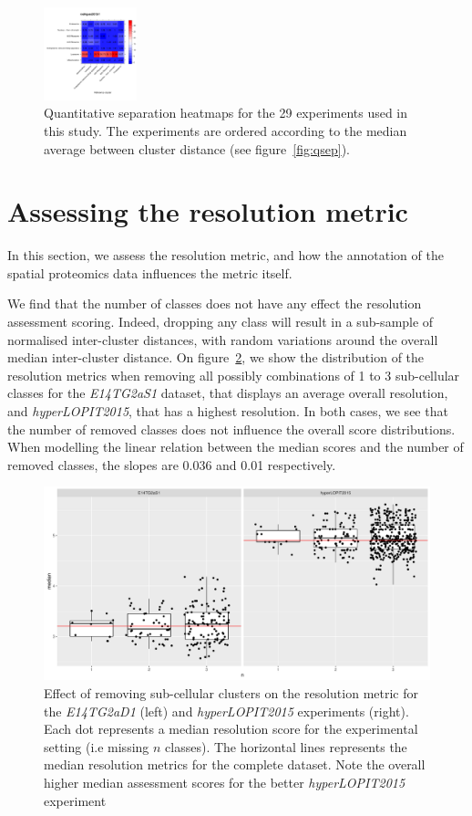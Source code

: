 \documentclass[12pt]{article}\usepackage[]{graphicx}\usepackage[]{color}
\begin{document}
\begin{figure}[p]
  \includegraphics[width = 0.24\textwidth]{./figure/allhmaps-20.pdf}
  \caption{Quantitative separation heatmaps for the 29
    experiments used in this study. The experiments are ordered
    according to the median average between cluster distance (see
    figure~\ref{fig:qsep}). }
  \label{fig:allhmaps}
\end{figure}

\clearpage

\section{Assessing the resolution metric}\label{sec:qsepassess}

In this section, we assess the resolution metric, and how the
annotation of the spatial proteomics data influences the metric
itself.



We find that the number of classes does not have any effect the resolution
assessment scoring. Indeed, dropping any class will result in a
sub-sample of normalised inter-cluster distances, with random
variations around the overall median inter-cluster distance. On
figure~\ref{fig:simn}, we show the distribution of the resolution
metrics when removing all possibly combinations of 1 to 3 sub-cellular
classes for the \textit{E14TG2aS1} dataset, that displays an average
overall resolution, and \textit{hyperLOPIT2015}, that has a highest
resolution. In both cases, we see that the number of removed classes
does not influence the overall score distributions. When modelling the
linear relation between the median scores and the number of removed
classes, the slopes are 0.036 and
0.01 respectively.

\begin{figure}[h]
  \centering
  \includegraphics[width = .7\textwidth]{simn.pdf}
  \caption{Effect of removing sub-cellular clusters on the resolution
    metric for the \textit{E14TG2aD1} (left) and
    \textit{hyperLOPIT2015} experiments (right). Each dot represents a
    median resolution score for the experimental setting (i.e missing
    $n$ classes). The horizontal lines represents the median resolution
    metrics for the complete dataset. Note the overall higher median
    assessment scores for the better \textit{hyperLOPIT2015}
    experiment }
  \label{fig:simn}
\end{figure}
\end{document}
